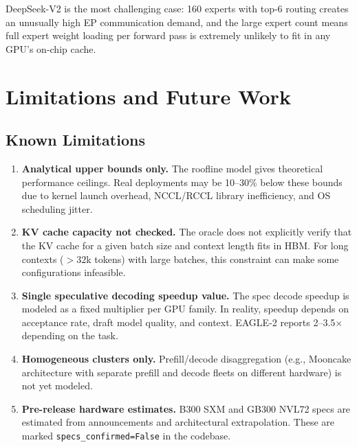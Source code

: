 \documentclass[11pt, letterpaper]{article}
\begin{document}
DeepSeek-V2 is the most challenging case: 160 experts with top-6 routing
creates an unusually high EP communication demand, and the large expert count
means full expert weight loading per forward pass is extremely unlikely to fit
in any GPU's on-chip cache.

\section{Limitations and Future Work}

\subsection{Known Limitations}

\begin{enumerate}
  \item \textbf{Analytical upper bounds only.} The roofline model gives
    theoretical performance ceilings. Real deployments may be 10--30\% below
    these bounds due to kernel launch overhead, NCCL/RCCL library inefficiency,
    and OS scheduling jitter.

  \item \textbf{KV cache capacity not checked.} The oracle does not explicitly
    verify that the KV cache for a given batch size and context length fits in
    HBM. For long contexts ($> 32$k tokens) with large batches, this constraint
    can make some configurations infeasible.

  \item \textbf{Single speculative decoding speedup value.} The spec decode
    speedup is modeled as a fixed multiplier per GPU family. In reality,
    speedup depends on acceptance rate, draft model quality, and context.
    EAGLE-2 reports 2--3.5$\times$ depending on the task.

  \item \textbf{Homogeneous clusters only.} Prefill/decode disaggregation
    (e.g., Mooncake architecture with separate prefill and decode fleets on
    different hardware) is not yet modeled.

  \item \textbf{Pre-release hardware estimates.} B300 SXM and GB300 NVL72
    specs are estimated from announcements and architectural extrapolation.
    These are marked \texttt{specs\_confirmed=False} in the codebase.
\end{enumerate}
\end{document}
